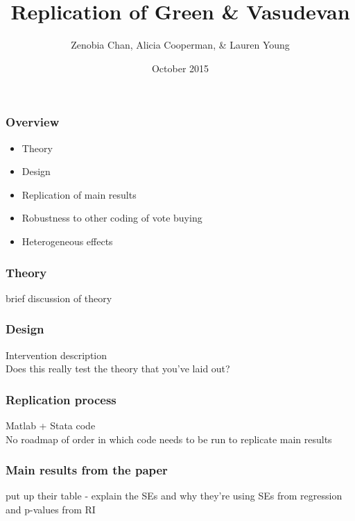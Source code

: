 \documentclass{beamer}
\institute{Columbia University}
\begin{document}
\title[SSDS]{Replication of Green \& Vasudevan}
\author{Zenobia Chan, Alicia Cooperman, \& Lauren Young}
\date{October 2015}

\begin{frame}
\titlepage
\end{frame}



\begin{frame}
\frametitle{Overview}

\begin{itemize}
\item Theory
\item Design
\item Replication of main results
\item Robustness to other coding of vote buying
\item Heterogeneous effects
\end{itemize}

\end{frame}


\begin{frame}
\frametitle{Theory}

brief discussion of theory

\end{frame}


\begin{frame}
\frametitle{Design}

Intervention description \\
Does this really test the theory that you've laid out?

\end{frame}



\begin{frame}
\frametitle{Replication process}

Matlab + Stata code \\
No roadmap of order in which code needs to be run to replicate main results 

\end{frame}


\begin{frame}
\frametitle{Main results from the paper}

put up their table - explain the SEs and why they're using SEs from regression and p-values from RI

\end{frame}
\end{document}
